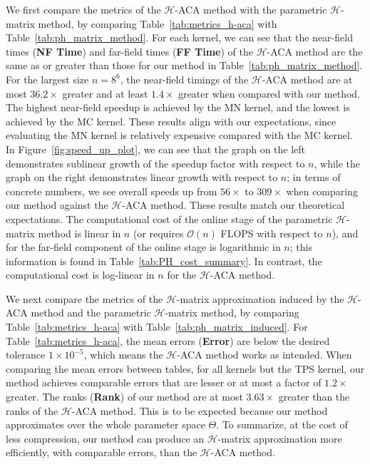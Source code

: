 \documentclass[final,3p,times]{elsarticle}
\newcommand{\mc}[1]{\mathcal{#1}}
\begin{document}
We first compare the metrics of the $\mc{H}$-ACA method with the parametric $\mc{H}$-matrix method, by comparing Table~\ref{tab:metrics_h-aca} with Table~\ref{tab:ph_matrix_method}. 
For each kernel, we can see that the near-field times (\textbf{NF Time}) and far-field times (\textbf{FF Time}) of the $\mc{H}$-ACA method are the same as or greater than those for our method in Table~\ref{tab:ph_matrix_method}. For the largest size $n = 8^6$, the near-field timings of the $\mc{H}$-ACA method are at most $36.2 \times$ greater and at least $1.4 \times$ greater when compared with our method. The highest near-field speedup is achieved by the MN kernel, and the lowest is achieved by the MC kernel. These results align with our expectations, since evaluating the MN kernel is relatively expensive compared with the MC kernel. In Figure~\ref{fig:speed_up_plot}, we can see  that the  graph on the left demonstrates sublinear growth of the speedup factor with respect to $n$, while the  graph on the right demonstrates linear growth with respect to $n$; in terms of concrete numbers, we see overall speeds up from $56 \times$ to $309\times$ when comparing our method against the $\mc{H}$-ACA method. These results match   our theoretical expectations. The  computational cost of the online stage of the parametric $\mc{H}$-matrix method is linear in $n$ (or requires $\mc{O}(n)$ FLOPS with respect to $n$), and for the far-field component of the online stage  is logarithmic in $n$; this information is found in Table~\ref{tab:PH_cost_summary}. In contrast, the computational cost is log-linear in $n$ for the $\mc{H}$-ACA method. 


We next compare the metrics of the $\mc{H}$-matrix approximation induced by the $\mc{H}$-ACA method and the parametric $\mc{H}$-matrix method, by comparing 
Table~\ref{tab:metrics_h-aca} with Table~\ref{tab:ph_matrix_induced}. 
For Table~\ref{tab:metrics_h-aca}, the mean errors (\textbf{Error}) are below the desired tolerance $1 \times 10^{-5}$, which means the $\mc{H}$-ACA method works as intended. When comparing the mean errors between tables, for all kernels but the TPS kernel, our method achieves comparable errors that are lesser or at most a factor of $1.2\times$ greater. The ranks (\textbf{Rank}) of our method are at most $3.63\times$ greater than the ranks of the $\mc{H}$-ACA method. This is to be expected because our method approximates over the whole parameter space $\Theta$. To summarize, at the cost of less compression,  our method can produce an $\mc{H}$-matrix approximation more efficiently, with comparable errors, than the $\mc{H}$-ACA method.
\end{document}
